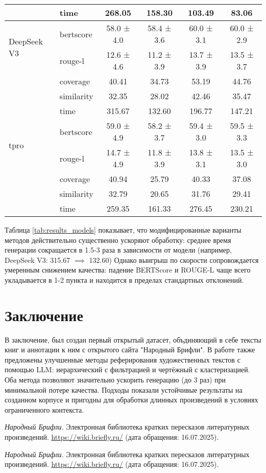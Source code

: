 \documentclass{article}
\theoremstyle{definition}
\theoremstyle{plain}
\begin{document}
\begin{table}[ht]
\begin{tabular}{llcccc}
 & time & 268.05 & 158.30 & 103.49 & 83.06 \\
\midrule
\multirow{2}{*}{DeepSeek V3}
 & bertscore & 58.0 ± 4.0 & 58.4 ± 3.6 & 60.0 ± 3.1 & 60.0 ± 2.9 \\
 & rouge-l & 12.6 ± 4.6 & 11.2 ± 3.9 & 13.7 ± 3.9 & 13.5 ± 3.7 \\
 & coverage & 40.41 & 34.73 & 53.19 & 44.76\\
 & similarity & 32.35 & 28.02 & 42.46 & 35.47\\
 & time & 315.67 & 132.60 & 196.77 & 147.21 \\
\midrule
\multirow{2}{*}{tpro}
 & bertscore & 59.0 ± 4.9 & 58.2 ± 3.7 & 59.4 ± 3.0 & 59.5 ± 3.3 \\
 & rouge-l & 14.7 ± 4.9 & 11.8 ± 3.9 & 13.8 ± 3.1 & 13.5 ± 3.0 \\
 & coverage & 40.94 & 25.79 & 40.33 & 37.08 \\
 & similarity & 32.79 & 20.65 & 31.76 & 29.41 \\
 & time & 259.35 & 161.33 & 276.45 & 230.21 \\ 
\bottomrule
\end{tabular}
\end{table}

Таблица \ref{tab:results_models} показывает, что модифицированные варианты методов действительно существенно ускоряют обработку: среднее время генерации сокращается в 1.5-3 раза в зависимости от модели (например, DeepSeek V3: 315.67 $\implies$ 132.60)
Однако выигрыш по скорости сопровождается умеренным снижением качества: падение BERTScore и ROUGE-L чаще всего укладывается в 1-2 пункта и находится в пределах стандартных отклонений.
\FloatBarrier
\section*{Заключение}
В заключение, был создан первый открытый датасет, объдиняющий в себе тексты книг и аннотации к ним с открытого сайта "Народный Брифли".
В работе также предложены улучшенные методы реферирования художественных текстов с помощью LLM: 
иерархический с фильтрацией и чертёжный с кластеризацией.
Оба метода позволяют значительно ускорить генерацию (до 3 раз) при минимальной потере качества. 
Подходы показали устойчивые результаты на созданном корпусе и пригодны для обработки длинных произведений в условиях ограниченного контекста.


\begin{thebibliography}{99}
\textit{Народный Брифли.}  
Электронная библиотека кратких пересказов литературных произведений.  
\url{https://wiki.briefly.ru/} (дата обращения: 16.07.2025).

\end{thebibliography}

\renewcommand\refname{References}


\begin{thebibliography}{99}
\textit{Народный Брифли.}  
Электронная библиотека кратких пересказов литературных произведений.  
\url{https://wiki.briefly.ru/} (дата обращения: 16.07.2025).

\end{thebibliography}
\end{document}

